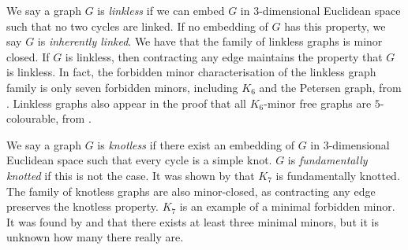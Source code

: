 We say a graph $G$ is \textit{linkless} if we can embed $G$ in 3-dimensional Euclidean space such that no two cycles are linked. If no embedding of $G$ has this property, we say $G$ is \textit{inherently linked}. We have that the family of linkless graphs is minor closed. If $G$ is linkless, then contracting any edge maintains the property that $G$ is linkless. In fact, the forbidden minor characterisation of the linkless graph family is only seven forbidden minors, including $K_6$ and the Petersen graph, from \textcite{robertsonSachsLinklessEmbedding1995}. Linkless graphs also appear in the proof that all $K_6$-minor free graphs are $5$-colourable, from \textcite{robertsonHadwigerConjectureK_61993}.

We say a graph $G$ is \textit{knotless} if there exist an embedding of $G$ in 3-dimensional Euclidean space such that every cycle is a simple knot. $G$ is \textit{fundamentally knotted} if this is not the case. It was shown by \textcite{conwayKnotsLinksSpatial1983} that $K_7$ is fundamentally knotted. The family of knotless graphs are also minor-closed, as contracting any edge preserves the knotless property. $K_7$ is an example of a minimal forbidden minor. It was found by \textcite{conwayKnotsLinksSpatial1983} and \textcite{foisyIntrinsicallyKnottedGraphs2002,foisyNewlyRecognizedIntrinsically2003} that there exists at least three minimal minors, but it is unknown how many there really are. 